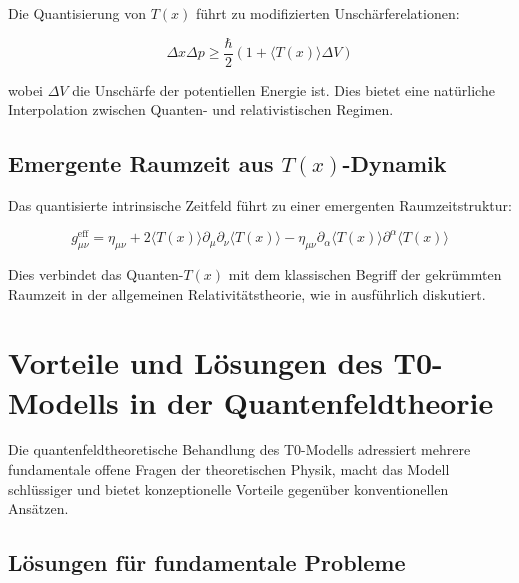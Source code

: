 \documentclass[12pt,a4paper]{article}
\newcommand{\Tfield}{T(x)}
\begin{document}
	Die Quantisierung von $\Tfield$ führt zu modifizierten Unschärferelationen:
	
	\begin{equation}
		\Delta x \Delta p \geq \frac{\hbar}{2}\left(1 + \langle \Tfield \rangle \Delta V\right)
	\end{equation}
	
	wobei $\Delta V$ die Unschärfe der potentiellen Energie ist. Dies bietet eine natürliche Interpolation zwischen Quanten- und relativistischen Regimen.
	
	\subsection{Emergente Raumzeit aus $\Tfield$-Dynamik}
	\label{sec:emergente_raumzeit}
	
	Das quantisierte intrinsische Zeitfeld führt zu einer emergenten Raumzeitstruktur:
	
	\begin{equation}
		g_{\mu\nu}^{\text{eff}} = \eta_{\mu\nu} + 2\langle \Tfield \rangle \partial_{\mu}\partial_{\nu}\langle \Tfield \rangle - \eta_{\mu\nu}\partial_{\alpha}\langle \Tfield \rangle \partial^{\alpha}\langle \Tfield \rangle
	\end{equation}
	
	Dies verbindet das Quanten-$\Tfield$ mit dem klassischen Begriff der gekrümmten Raumzeit in der allgemeinen Relativitätstheorie, wie in \cite{pascher_emergente_gravitation_2025} ausführlich diskutiert.
	
	\section{Vorteile und Lösungen des T0-Modells in der Quantenfeldtheorie}
	\label{sec:vorteile_loesungen}
	
	Die quantenfeldtheoretische Behandlung des T0-Modells adressiert mehrere fundamentale offene Fragen der theoretischen Physik, macht das Modell schlüssiger und bietet konzeptionelle Vorteile gegenüber konventionellen Ansätzen.
	
	\subsection{Lösungen für fundamentale Probleme}
	\label{sec:loesungen_probleme}
	
\end{document}
